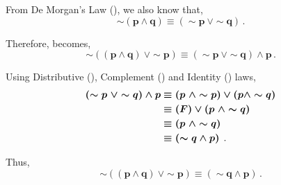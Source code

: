 \begin{subquestions}
From De Morgan's Law (), we also know that,
\begin{equation}
	\boldsymbol{\sim(p \land q) \equiv (\sim p ~\lor \sim q)} \,.
\end{equation}

Therefore,  becomes,
\begin{equation}
	\boldsymbol{\sim((p \land q) ~\lor \sim p)  \equiv (\sim p ~\lor \sim q) \land p} \,.
\end{equation}

Using Distributive (), Complement () and Identity () laws,
\begin{align}
	\boldsymbol{(\sim p ~\lor \sim q) \land p} & \boldsymbol{\equiv (p ~\land \sim p) \lor (p \land \sim q)} \nonumber \\
	                              & \boldsymbol{\equiv (F) \lor (p ~\land \sim q)} \nonumber \\
	                              & \boldsymbol{\equiv (p ~\land \sim q) \nonumber} \\
								  & \boldsymbol{\equiv (\sim q \land p)} \,.
\end{align}

Thus,
\begin{equation}
	\boldsymbol{\sim((p \land q) ~\lor \sim p) \equiv (\sim q \land p)} \,.
\end{equation}

\end{subquestions}


